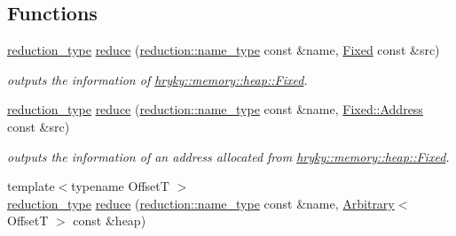 \subsection*{Functions}
\begin{DoxyCompactItemize}
\item 
\hypertarget{namespacehryky_1_1memory_1_1heap_a3338ac1ff48a602ce216dec92a614f87}{\hyperlink{namespacehryky_a343a9a4c36a586be5c2693156200eadc}{reduction\-\_\-type} \hyperlink{namespacehryky_1_1memory_1_1heap_a3338ac1ff48a602ce216dec92a614f87}{reduce} (\hyperlink{namespacehryky_1_1reduction_ac686c30a4c8d196bbd0f05629a6b921f}{reduction\-::name\-\_\-type} const \&name, \hyperlink{classhryky_1_1memory_1_1heap_1_1_fixed}{Fixed} const \&src)}\label{namespacehryky_1_1memory_1_1heap_a3338ac1ff48a602ce216dec92a614f87}

\begin{DoxyCompactList}\small\item\em outputs the information of \hyperlink{classhryky_1_1memory_1_1heap_1_1_fixed}{hryky\-::memory\-::heap\-::\-Fixed}. \end{DoxyCompactList}\item 
\hypertarget{namespacehryky_1_1memory_1_1heap_a5ff1dd8b45684d0e443a6706a1c9a732}{\hyperlink{namespacehryky_a343a9a4c36a586be5c2693156200eadc}{reduction\-\_\-type} \hyperlink{namespacehryky_1_1memory_1_1heap_a5ff1dd8b45684d0e443a6706a1c9a732}{reduce} (\hyperlink{namespacehryky_1_1reduction_ac686c30a4c8d196bbd0f05629a6b921f}{reduction\-::name\-\_\-type} const \&name, \hyperlink{structhryky_1_1memory_1_1heap_1_1_fixed_1_1_address}{Fixed\-::\-Address} const \&src)}\label{namespacehryky_1_1memory_1_1heap_a5ff1dd8b45684d0e443a6706a1c9a732}

\begin{DoxyCompactList}\small\item\em outputs the information of an address allocated from \hyperlink{classhryky_1_1memory_1_1heap_1_1_fixed}{hryky\-::memory\-::heap\-::\-Fixed}. \end{DoxyCompactList}\item 
\hypertarget{namespacehryky_1_1memory_1_1heap_aa4df42a3456c681bd0b3c0e44fced36b}{{\footnotesize template$<$typename Offset\-T $>$ }\\\hyperlink{namespacehryky_a343a9a4c36a586be5c2693156200eadc}{reduction\-\_\-type} \hyperlink{namespacehryky_1_1memory_1_1heap_aa4df42a3456c681bd0b3c0e44fced36b}{reduce} (\hyperlink{namespacehryky_1_1reduction_ac686c30a4c8d196bbd0f05629a6b921f}{reduction\-::name\-\_\-type} const \&name, \hyperlink{classhryky_1_1memory_1_1heap_1_1_arbitrary}{Arbitrary}$<$ Offset\-T $>$ const \&heap)}\label{namespacehryky_1_1memory_1_1heap_aa4df42a3456c681bd0b3c0e44fced36b}


\end{DoxyCompactItemize}
